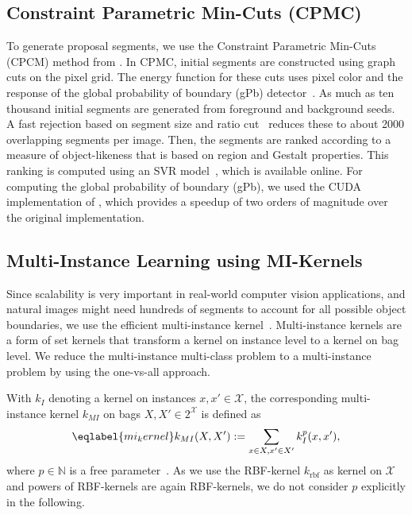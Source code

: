 \subsection{Constraint Parametric Min-Cuts (CPMC)}
To generate proposal segments, we use the Constraint Parametric Min-Cuts (CPCM)
method from \citet{carreira2010constrained}. In CPMC, initial segments are
constructed using graph cuts on the pixel grid. The energy function for these cuts
uses pixel color and the response of the global probability of boundary (gPb)
detector~\citep{maire2008using}. As much as ten thousand initial segments are
generated from foreground and background seeds. A fast rejection based on
segment size and ratio cut~\citep{wang2003image} reduces these to about 2000
overlapping segments per image. Then, the segments are ranked according to a
measure of object-likeness that is based on region and Gestalt properties.
This ranking is computed using an SVR model~\citep{carreira2010constrained},
which is available online. 
\enlargethispage{10mm}
For computing the global probability of boundary
(gPb), we used the CUDA implementation of \citet{catanzaro2009efficient}, which
provides a speedup of two orders of magnitude over the original implementation.

\subsection{Multi-Instance Learning using MI-Kernels}
Since scalability is very important in real-world computer vision applications,
and natural images might need hundreds of segments to account for all possible
object boundaries, we use the efficient multi-instance
kernel~\citep{gaertner2002multi}.  Multi-instance kernels are a form of set
kernels %
 that transform a kernel on instance level to a kernel on bag level.  We
reduce the multi-instance multi-class problem to a multi-instance problem by
using the one-vs-all approach.

With $k_I$ denoting a kernel on instances $x,x' \in \mathcal{X}$, the
corresponding multi-instance kernel $k_{MI}$ on bags $X,X' \in 2^\mathcal{X}$
is defined as
\begin{equation}\eqlabel{mi_kernel}
k_{MI}(X,X') := \sum_{x \in X, x' \in X'} k_I^p(x,x'),
\end{equation}
where $p \in \mathbb{N}$ is a free parameter~\citep{gaertner2002multi}. As we use
the RBF-kernel $k_{\text{rbf}}$ as kernel on $\mathcal{X}$ and powers of RBF-kernels
are again RBF-kernels, we do not consider $p$ explicitly in the following.

